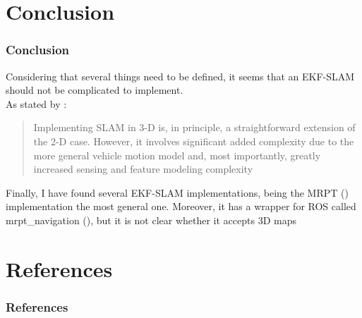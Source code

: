 \documentclass{beamer}
\begin{document}
    \section{Conclusion}
    \begin{frame}
        \justifying
        \frametitle{Conclusion}
        Considering that several things need to be defined, it seems that an EKF-SLAM should not be complicated to implement. \\[10pt]

        As stated by \cite{Bailey1}: \\

        \blockquote{Implementing SLAM in 3-D is, in principle, a straightforward extension of the 2-D case. However, it involves significant added complexity due to the more general vehicle motion model and, most importantly, greatly increased sensing and feature modeling complexity}

        Finally, I have found several EKF-SLAM implementations, being the MRPT (\citet{6dofekfslamBlanco}) implementation the most general one. Moreover, it has a wrapper for ROS called mrpt\_navigation (\citet{blancoMRPT}), but it is not clear whether it accepts 3D maps

    \end{frame}

    \section{References}
    \begin{frame}[allowframebreaks]
        \frametitle{References}

        \nocite{2,3,4,5,6,7,8,9,10,11,12,13,14}
        

    \end{frame}
\end{document}

